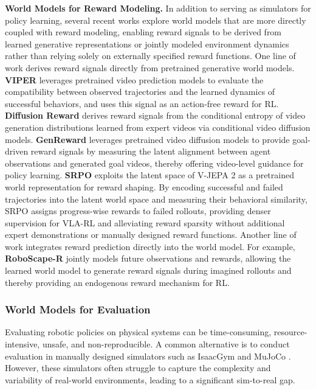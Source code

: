 \textbf{World Models for Reward Modeling.} 
In addition to serving as simulators for policy learning, several recent works explore world models that are more directly coupled with reward modeling, enabling reward signals to be derived from learned generative representations or jointly modeled environment dynamics rather than relying solely on externally specified reward functions. 
One line of work derives reward signals directly from pretrained generative world models. \textbf{VIPER} \cite{VIPER} leverages pretrained video prediction models to evaluate the compatibility between observed trajectories and the learned dynamics of successful behaviors, and uses this signal as an action-free reward for RL. \textbf{Diffusion Reward} \cite{Diffusion_Reward} derives reward signals from the conditional entropy of video generation distributions learned from expert videos via conditional video diffusion models. \textbf{GenReward} \cite{GenReward} leverages pretrained video diffusion models to provide goal-driven reward signals by measuring the latent alignment between agent observations and generated goal videos, thereby offering video-level guidance for policy learning. \textbf{SRPO} \cite{fei2025srposelfreferentialpolicyoptimization} exploits the latent space of V-JEPA 2 as a pretrained world representation for reward shaping. By encoding successful and failed trajectories into the latent world space and measuring their behavioral similarity, SRPO assigns progress-wise rewards to failed rollouts, providing denser supervision for VLA-RL and alleviating reward sparsity without additional expert demonstrations or manually designed reward functions.
Another line of work integrates reward prediction directly into the world model. For example, \textbf{RoboScape-R} \cite{RoboScape-R} jointly models future observations and rewards, allowing the learned world model to generate reward signals during imagined rollouts and thereby providing an endogenous reward mechanism for RL.

\subsubsection{World Models for Evaluation}


Evaluating robotic policies on physical systems can be time-consuming, resource-intensive, unsafe, and non-reproducible. A common alternative is to conduct evaluation in manually designed simulators such as IsaacGym \cite{IsaacGym} and MuJoCo \cite{Mujoco}. However, these simulators often struggle to capture the complexity and variability of real-world environments, leading to a significant sim-to-real gap. 

